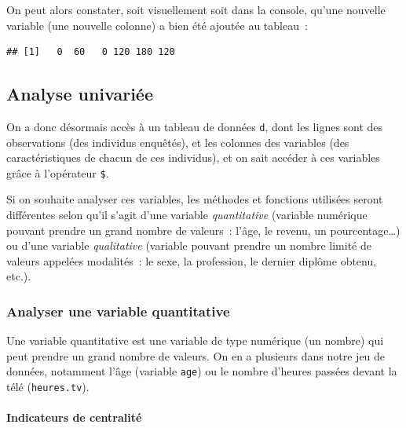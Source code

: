 \documentclass[12pt,]{book}
\newenvironment{Shaded}{\begin{snugshade}}{\end{snugshade}}
\newcommand{\KeywordTok}[1]{\textcolor[rgb]{0.27,0.27,0.27}{\textbf{#1}}}
\newcommand{\NormalTok}[1]{#1}
\newcommand{\OperatorTok}[1]{\textcolor[rgb]{0.43,0.43,0.43}{\textbf{#1}}}
\let\oldparagraph\paragraph
\renewcommand{\paragraph}[1]{\oldparagraph{#1}\mbox{}}
\begin{document}
On peut alors constater, soit visuellement soit dans la console, qu'une nouvelle variable (une nouvelle colonne) a bien été ajoutée au tableau~:

\begin{Shaded}
\end{Shaded}

\begin{verbatim}
## [1]   0  60   0 120 180 120
\end{verbatim}

\hypertarget{analyse-univariuxe9e}{%
\subsection{Analyse univariée}\label{analyse-univariuxe9e}}

On a donc désormais accès à un tableau de données \texttt{d}, dont les lignes sont des observations (des individus enquêtés), et les colonnes des variables (des caractéristiques de chacun de ces individus), et on sait accéder à ces variables grâce à l'opérateur \texttt{\$}.

Si on souhaite analyser ces variables, les méthodes et fonctions utilisées seront différentes selon qu'il s'agit d'une variable \emph{quantitative} (variable numérique pouvant prendre un grand nombre de valeurs~: l'âge, le revenu, un pourcentage\ldots{}) ou d'une variable \emph{qualitative} (variable pouvant prendre un nombre limité de valeurs appelées modalités~: le sexe, la profession, le dernier diplôme obtenu, etc.).

\hypertarget{analyser-une-variable-quantitative}{%
\subsubsection{Analyser une variable quantitative}\label{analyser-une-variable-quantitative}}

Une variable quantitative est une variable de type numérique (un nombre) qui peut prendre un grand nombre de valeurs. On en a plusieurs dans notre jeu de données, notamment l'âge (variable \texttt{age}) ou le nombre d'heures passées devant la télé (\texttt{heures.tv}).

\hypertarget{indicateurs-de-centralituxe9}{%
\paragraph{Indicateurs de centralité}\label{indicateurs-de-centralituxe9}}
\end{document}
